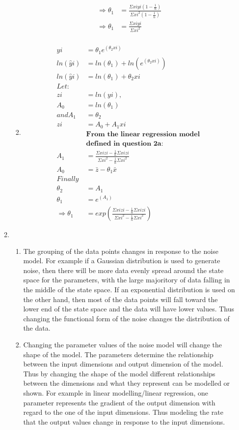 \documentclass{article}
\begin{document}
\begin{enumerate}
\begin{enumerate}[label=\arabic*)]
\begin{enumerate}[label=\alph*)]
\begin{align*}
					\Rightarrow \theta_1 & = \frac{\Sigma xiyi (1 - \frac{1}{n})}{\Sigma xi^2(1 - \frac{1}{n})} \\
					\Rightarrow \theta_1 & = \frac{\Sigma xiyi}{\Sigma xi^2} \\
				\end{align*}
				\item
				\begin{align*}
					\hat yi &= \theta_1e^(\theta_2xi) \\
					ln(\hat yi) &= ln(\theta_1) + ln(e^(\theta_2xi)) \\
					ln(\hat yi) &= ln(\theta_1) + \theta_2xi \\			
					Let: \\
					zi &= ln(yi),\\ A_0 &= ln(\theta_1) \\ and A_1 &= \theta_2 \\
					zi &= A_0 + A_1xi \\
					&\textbf{From the linear regression model } \\&\textbf{defined in question 2a:} \\
					A_1 &= \frac{\Sigma xizi - \frac{1}{n}\Sigma xizi}{\Sigma xi^2 - \frac{1}{n}\Sigma xi^2} \\
					A_0 &= \bar z - \theta_1 \bar x \\
					Finally \\
					\theta_2 &= A_1 \\
					\theta_1 &= e^(A_1) \\
					\Rightarrow \theta_1 &= exp(\frac{\Sigma xizi - \frac{1}{n}\Sigma xizi}{\Sigma xi^2 - \frac{1}{n}\Sigma xi^2}) 
				\end{align*}
				\end{enumerate}
			\item
				\begin{enumerate}[label=\alph*)]
					\item The grouping of the data points changes in response to the noise model. For example if a Gaussian distribution is used to generate noise, then there will be more data evenly spread around the state space for the parameters, with the large majoritory of data falling in the middle of the state space. If an exponential distribution is used on the other hand, then most of the data points will fall toward the lower end of the state space and the data will have lower values. Thus changing the functional form of the noise changes the distribution of the data. \\
					\item Changing the parameter values of the noise model will change the shape of the model. The parameters determine the relationship between the input dimensions and output dimension of the model. Thus by changing the shape of the model different relationships between the dimensions and what they represent can be modelled or shown. For example in linear modelling/linear regression, one parameter represents the gradient of the output dimension with regard to the one of the input dimensions. Thus modeling the rate that the output values change in response to the input dimensions. \\ 

\end{enumerate}
\end{enumerate}
\end{enumerate}
\end{document}
